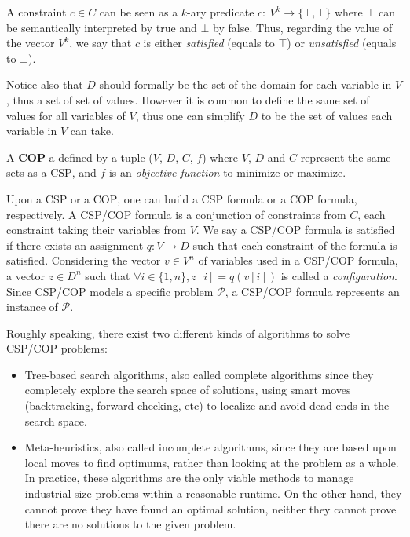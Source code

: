 \documentclass[journal]{IEEEtran}
\newcommand{\csp}{\textsc{CSP}\xspace}
\newcommand{\cop}{\textsc{COP}\xspace}
\begin{document}
A  constraint  $c   \in  C$  can  be  seen  as   a  $k$-ary  predicate
$c:~V^k\rightarrow\{\top,\bot\}$  where  $\top$  can  be  semantically
interpreted by true and $\bot$ by  false. Thus, regarding the value of
the vector $V^k$, we say that $c$ is either {\it satisfied} (equals to
$\top$) or {\it unsatisfied} (equals to $\bot$).

Notice also that $D$ should formally be the set of the domain for each
variable in $V$, thus a set of  set of values. However it is common to
define the same set  of values for all variables of  $V$, thus one can
simplify $D$ to be the set of values each variable in $V$ can take.

A {\bf \cop} a defined by a tuple ($V$, $D$, $C$, $f$) where $V$, $D$ and
$C$ represent the same sets as a \csp, and $f$ is an {\it objective
function} to minimize  or maximize.

Upon a \csp or a \cop, one can build a \csp formula or a \cop formula,
respectively.   A \csp/\cop  formula is  a conjunction  of constraints
from $C$,  each constraint taking their  variables from $V$. We  say a
\csp/\cop formula  is satisfied  if there exists  an assignment  $q: V
\rightarrow  D$   such  that  each   constraint  of  the   formula  is
satisfied. Considering the  vector $v \in V^n$ of variables  used in a
\csp/\cop formula, a vector $z \in D^n$ such that
$\forall i \in \{1,n\}, z[i] = q(v[i])$ 
is called a {\it configuration}.  Since
\csp/\cop models a specific problem $\mathcal{P}$, a \csp/\cop formula
represents an instance of $\mathcal{P}$.

Roughly speaking,  there exist  two different  kinds of  algorithms to
solve \csp/\cop problems:
\begin{itemize}
\item Tree-based  search algorithms,  also called  complete algorithms
  since they completely  explore the search space  of solutions, using
  smart moves  (backtracking, forward  checking, etc) to  localize and
  avoid dead-ends in the search space.
\item Meta-heuristics,  also called incomplete algorithms,  since they
  are based upon local moves to  find optimums, rather than looking at
  the problem as  a whole. In practice, these algorithms  are the only
  viable  methods   to  manage   industrial-size  problems   within  a
  reasonable runtime. On  the other hand, they cannot  prove they have
  found an  optimal solution, neither  they cannot prove there  are no
  solutions to the given problem.
\end{itemize}
\end{document}
